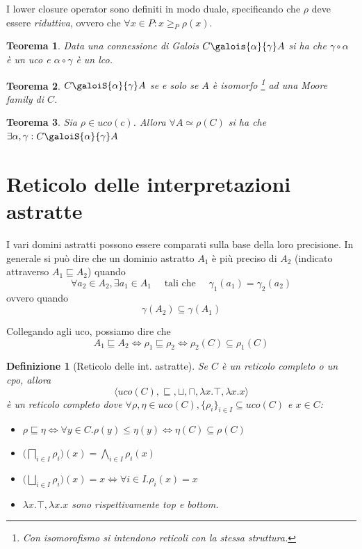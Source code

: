 \documentclass[a4paper, 10pt]{book}
\newtheorem{definit}{Definizione}[subsection]
\newtheorem{thm}{Teorema}[subsection]
\begin{document}
	I lower closure operator sono definiti in modo duale, specificando che $\rho$ deve essere \textit{riduttiva}, ovvero che $\forall x \in P: x \geq_P \rho(x)$.
	
	\begin{thm}
		Data una connessione di Galois $C \galois{\alpha}{\gamma} A$ si ha che $\gamma \circ \alpha$ è un uco e $\alpha \circ \gamma $ è un lco.
	\end{thm}
	\begin{thm}
		$C \galoiS{\alpha}{\gamma} A$ se e solo se $A$ è isomorfo \footnote{Con isomorofismo si intendono reticoli con la stessa struttura.} ad una Moore family di $C$.
	\end{thm}
	\begin{thm}
		Sia $\rho \in uco(c)$. Allora $\forall A \simeq \rho(C)$ si ha che $\exists \alpha, \gamma : C \galoiS{\alpha}{\gamma} A$
	\end{thm}
	
	\section{Reticolo delle interpretazioni astratte}
	I vari domini astratti possono essere comparati sulla base della loro precisione. In generale si può dire che un dominio astratto $A_1$ è più preciso di $A_2$ (indicato attraverso $A_1 \sqsubseteq A_2$) quando \[ \forall a_2 \in A_2, \exists a_1 \in A_1 \quad \text{ tali che } \quad \gamma_1(a_1) = \gamma_2(a_2) \] ovvero quando \[ \gamma(A_2) \subseteq \gamma(A_1) \]
	
	Collegando agli uco, possiamo dire che \[ A_1 \sqsubseteq A_2 \Leftrightarrow \rho_1 \sqsubseteq \rho_2 \Leftrightarrow \rho_2(C) \subseteq \rho_1(C) \]
	
	\begin{definit}[Reticolo delle int. astratte]
		Se $C$ è un reticolo completo o un cpo, allora \[ \langle uco(C), \sqsubseteq, \sqcup, \sqcap, \lambda x.\top, \lambda x.x \rangle \] è un reticolo completo dove $\forall \rho, \eta \in uco(C), \{ \rho_i \}_{i \in I} \subseteq uco(C)$ e $x \in C$:\begin{itemize}
			\item $\rho \sqsubseteq \eta \Leftrightarrow \forall y \in C.\rho(y) \leq \eta(y) \Leftrightarrow \eta(C) \subseteq \rho(C)$
			
			\item $ \displaystyle \Big( \bigsqcap_{i \in I} \rho_i \Big)(x) = \bigwedge_{i \in I} \rho_i(x)$
			
			\item $ \displaystyle \Big( \bigsqcup_{i \in I} \rho_i \Big)(x) = x \Leftrightarrow \forall i \in I. \rho_i(x)=x$
			
			\item $\lambda x.\top, \lambda x.x$ sono rispettivamente top e bottom. 
		\end{itemize}
	\end{definit}
\end{document}
